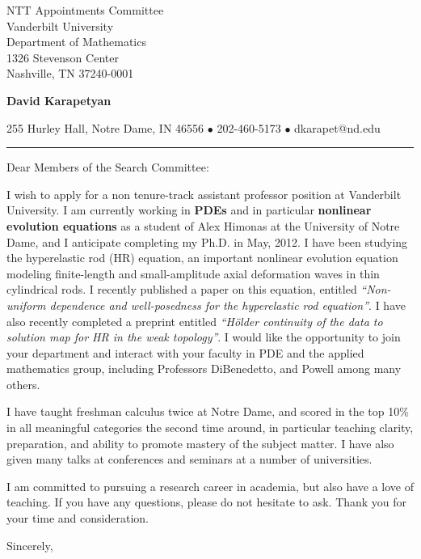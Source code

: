 \documentclass[12pt]{letter}
\date{\vspace{0.5cm}\flushleft \today}
\begin{document}
\begin{letter}{NTT Appointments Committee \\
Vanderbilt University \\
Department of Mathematics \\
1326 Stevenson Center \\
Nashville, TN 37240-0001 
  }
    \begin{center}
{\bf {\Large David Karapetyan}}
\end{center}

\begin{center}
{255 Hurley Hall, Notre Dame, IN 46556  $\bullet$
202-460-5173 $\bullet$ dkarapet@nd.edu
}
\end{center}
\hrule

\opening{Dear Members of the Search Committee:\\}
%
%
I wish to apply for a non tenure-track assistant professor position at 
Vanderbilt University. I am currently working in \textbf{PDEs} and in particular
\textbf{nonlinear evolution equations} as a student of Alex Himonas at the
University of Notre Dame, and I anticipate completing my Ph.D.
in May, 2012. I
have been studying the hyperelastic rod (HR) equation, an important nonlinear
evolution equation modeling finite-length and small-amplitude axial deformation
waves in thin cylindrical rods. I recently published a paper on this equation,
entitled {\it ``Non-uniform dependence and well-posedness for the hyperelastic
rod equation''}. I have also recently completed a preprint entitled {\it
  ``H\"older continuity of the data to solution map for HR in the weak
topology''}. I would like the opportunity to join your department and interact
with your faculty in PDE and the applied mathematics group, including
Professors DiBenedetto, and Powell among many others.

I have taught freshman calculus twice at Notre Dame, and scored in the top 10\%
in all meaningful categories the second time around, in particular teaching
clarity, preparation, and ability to promote mastery of the subject matter. I
have also given many talks at conferences and seminars at a number of
universities. 

I am committed to pursuing a research career in academia, but also have a love
of teaching. If you have any questions, please do not hesitate to ask. Thank you for your time and consideration. 

\closing{Sincerely,}


\end{letter}
\end{document}

